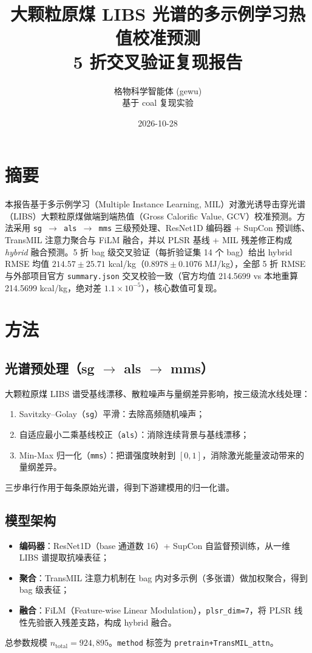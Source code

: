 \documentclass[11pt,a4paper]{ctexart}
\title{大颗粒原煤 LIBS 光谱的多示例学习热值校准预测\\
\large 5 折交叉验证复现报告}
\author{格物科学智能体 (gewu)\\基于 coal 复现实验}
\date{2026-10-28}
\begin{document}
\maketitle
\tableofcontents
\newpage

\section{摘要}
本报告基于多示例学习（Multiple Instance Learning, MIL）对激光诱导击穿光谱（LIBS）大颗粒原煤做端到端热值（Gross Calorific Value, GCV）校准预测。方法采用 \texttt{sg $\rightarrow$ als $\rightarrow$ mms} 三级预处理、ResNet1D 编码器 + SupCon 预训练、TransMIL 注意力聚合与 FiLM 融合，并以 PLSR 基线 + MIL 残差修正构成 \emph{hybrid} 融合预测。5 折 bag 级交叉验证（每折验证集 14 个 bag）给出 hybrid RMSE 均值 $214.57 \pm 25.71$ kcal/kg（$0.8978 \pm 0.1076$ MJ/kg），全部 5 折 RMSE 与外部项目官方 \texttt{summary.json} 交叉校验一致（官方均值 214.5699 vs 本地重算 214.5699 kcal/kg，绝对差 $1.1\times 10^{-5}$），核心数值可复现。

\section{方法}
\subsection{光谱预处理（sg $\rightarrow$ als $\rightarrow$ mms）}
大颗粒原煤 LIBS 谱受基线漂移、散粒噪声与量纲差异影响，按三级流水线处理：
\begin{enumerate}
  \item Savitzky--Golay（\texttt{sg}）平滑：去除高频随机噪声；
  \item 自适应最小二乘基线校正（\texttt{als}）：消除连续背景与基线漂移；
  \item Min-Max 归一化（\texttt{mms}）：把谱强度映射到 $[0,1]$，消除激光能量波动带来的量纲差异。
\end{enumerate}
三步串行作用于每条原始光谱，得到下游建模用的归一化谱。

\subsection{模型架构}
\begin{itemize}
  \item \textbf{编码器}：ResNet1D（base 通道数 16）+ SupCon 自监督预训练，从一维 LIBS 谱提取抗噪表征；
  \item \textbf{聚合}：TransMIL 注意力机制在 bag 内对多示例（多张谱）做加权聚合，得到 bag 级表征；
  \item \textbf{融合}：FiLM（Feature-wise Linear Modulation），\texttt{plsr\_dim=7}，将 PLSR 线性先验嵌入残差支路，构成 hybrid 融合。
\end{itemize}
总参数规模 $n_{\text{total}} = 924{,}895$。\texttt{method} 标签为 \texttt{pretrain+TransMIL\_attn}。
\end{document}
